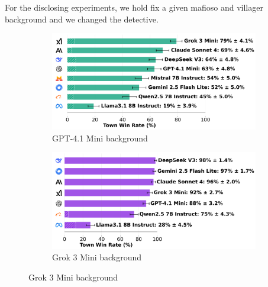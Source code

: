 \documentclass{article}
\begin{document}
For the disclosing experiments, we hold fix a given mafioso and villager background and we changed the detective.

\begin{figure}[htbp]
    \centering
    \begin{subfigure}[b]{0.48\textwidth}
        \centering
        \includegraphics[width=\textwidth]{../results/detective_gpt-4.1_mini_v4_1_benchmark.png}
        \caption{GPT-4.1 Mini background}
        \label{fig:detective_gpt41mini}
    \end{subfigure}
    \hfill
    \begin{subfigure}[b]{0.48\textwidth}
        \centering
        \includegraphics[width=\textwidth]{../results/detective_grok_3_mini_v4_1_benchmark.png}
        \caption{Grok 3 Mini background}
        \label{fig:detective_grok3}
    \end{subfigure}
    
    \vspace{0.5cm}
    

\end{figure}
\end{document}
